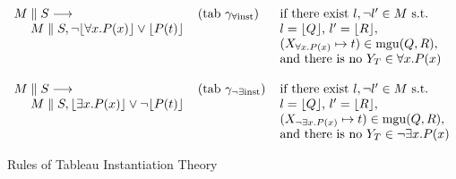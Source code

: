 \begin{figure}[htbp]
\parbox{\textwidth}
{\small
\begin{center}
$\begin{array}{l@{\hspace{0.4cm}}l@{\hspace{0.4cm}}l}
M\parallel{}S\longrightarrow & (\mathrm{tab~\gamma_{\forall\mathrm{inst}}}) &
\mbox{if there exist }l,\neg{}l'\in{}M\mbox{ s.t. }\\
~~~~M\parallel{}S,\neg\lfloor\forall{}x.P(x)\rfloor\lor\lfloor{}P(t)\rfloor &&
l=\lfloor{}Q\rfloor\mbox{, }l'=\lfloor{}R\rfloor,\\
&& (X_{\forall{}x.P(x)}\mapsto{}t)\in\mathrm{mgu}(Q,R),\\
&& \mbox{and there is no }Y_T\in\forall{}x.P(x)\\\\

M\parallel{}S\longrightarrow &
(\mathrm{tab~\gamma_{\neg\exists\mathrm{inst}}}) &
\mbox{if there exist }l,\neg{}l'\in{}M\mbox{ s.t. }\\
~~~~M\parallel{}S,\lfloor\exists{}x.P(x)\rfloor\lor\neg\lfloor{}P(t)\rfloor &&
l=\lfloor{}Q\rfloor\mbox{, }l'=\lfloor{}R\rfloor,\\
&& (X_{\neg\exists{}x.P(x)}\mapsto{}t)\in\mathrm{mgu}(Q,R),\\
&& \mbox{and there is no }Y_T\in\neg\exists{}x.P(x)
\end{array}$
\end{center}}
\caption{Rules of Tableau Instantiation Theory}
\label{fig:tabinst}
\end{figure}

